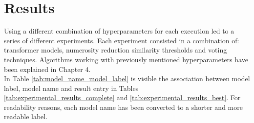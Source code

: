 \documentclass[\main/main.tex]{subfiles}
\begin{document}
\section{Results}
Using a different combination of hyperparameters for each execution led to a series of different experiments. Each experiment consisted in a combination of: transformer models, numerosity reduction similarity thresholds and voting techniques. Algorithms working with previously mentioned hyperparameters have been explained in Chapter 4.\\
In Table \ref{tab:model_name_model_label} is visible the association between model label, model name and result entry in Tables \ref{tab:experimental_results_complete} and \ref{tab:experimental_results_best}. For readability reasons, each model name has been converted to a shorter and more readable label.
\begin{table}[H]
    \centering
    \caption{Model name - Model label - Table entry correspondence}
    \label{tab:model_name_model_label}
\end{table}
\end{document}
